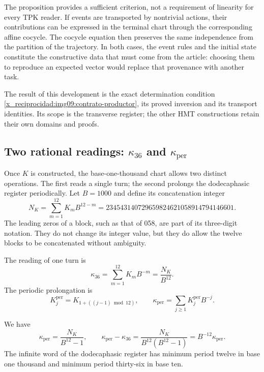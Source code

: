 The proposition provides a sufficient criterion, not a requirement of
linearity for every TPK reader. If events are transported by nontrivial
actions, their contributions can be expressed in the terminal chart
through the corresponding affine cocycle. The cocycle equation then preserves
the same independence from the partition of the trajectory.
In both cases, the event rules and the initial state constitute the
constructive data that must come from the article: choosing them to
reproduce an expected vector would replace that provenance with another task.

The result of this development is the exact determination condition \eqref{x_reciprocidad:img09:contrato-productor}, its proved inversion and its transport identities. Its scope is the transverse register; the other HMT constructions retain their own domains and proofs.



\subsection{Two rational readings: \texorpdfstring{\(\kappa_{36}\)}{kappa36} and \texorpdfstring{\(\kappa_{\mathrm{per}}\)}{periodic kappa}}
\label{x_reciprocidad:subsec:k-kappas}

Once \(K\) is constructed, the base-one-thousand chart allows two distinct
operations. The first reads a single turn; the second prolongs the dodecaphasic register
periodically. Let \(B=1000\) and define its concatenation integer
\begin{equation}
 N_K=\sum_{m=1}^{12}K_mB^{12-m}
 =234543140729659824621058914794146601.
 \label{x_reciprocidad:eq:k-numerador}
\end{equation}
The leading zeros of a block, such as that of 058, are part of its three-digit
notation. They do not change its integer value, but they do allow the twelve blocks
to be concatenated without ambiguity.

\begin{definition}
\label{x_reciprocidad:def:k-kappas}
The reading of one turn is
\[
 \kappa_{36}=\sum_{m=1}^{12}K_mB^{-m}=\frac{N_K}{B^{12}}.
\]
The periodic prolongation is
\[
 K_j^{\mathrm{per}}=K_{1+((j-1)\bmod12)},\qquad
 \kappa_{\mathrm{per}}=\sum_{j\geq1}K_j^{\mathrm{per}}B^{-j}.
\]
\end{definition}

\begin{proposition}
\label{x_reciprocidad:prop:k-periodo}
We have
\begin{equation}
 \kappa_{\mathrm{per}}=\frac{N_K}{B^{12}-1},\qquad
 \kappa_{\mathrm{per}}-\kappa_{36}
 =\frac{N_K}{B^{12}(B^{12}-1)}
 =B^{-12}\kappa_{\mathrm{per}}.
 \label{x_reciprocidad:eq:k-diferencia-kappas}
\end{equation}
The infinite word of the dodecaphasic register has minimum period twelve in base one thousand and
minimum period thirty-six in base ten.
\end{proposition}

